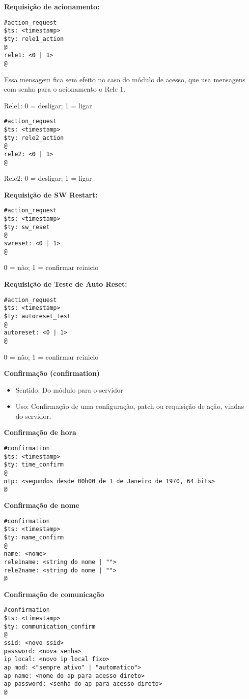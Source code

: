 \textbf{Requisição de acionamento:}
\begin{lstlisting}
#action_request
$ts: <timestamp>
$ty: rele1_action 
@
rele1: <0 | 1>
@
\end{lstlisting}
Essa mensagem fica sem efeito no caso do módulo de acesso, que usa mensagens com senha para o acionamento o Rele 1.

Rele1: 0 = desligar; 1 = ligar

\begin{lstlisting}
#action_request
$ts: <timestamp>
$ty: rele2_action
@
rele2: <0 | 1>
@
\end{lstlisting}
Rele2: 0 = desligar; 1 = ligar

\textbf{Requisição de SW Restart:}
\begin{lstlisting}
#action_request
$ts: <timestamp>
$ty: sw_reset
@
swreset: <0 | 1>
@
\end{lstlisting}
0 = não; 1 = confirmar reinicio

\textbf{Requisição de Teste de Auto Reset:}
\begin{lstlisting}
#action_request
$ts: <timestamp>
$ty: autoreset_test
@
autoreset: <0 | 1>
@
\end{lstlisting}
0 = não; 1 = confirmar reinicio

\textbf{Confirmação (confirmation)}
\begin{itemize}
\item Sentido: Do módulo para o servidor
\item Uso: Confirmação de uma configuração, patch ou requisição de ação, vindas do servidor.
\end{itemize}

\textbf{Confirmação de hora}
\begin{lstlisting}
#confirmation
$ts: <timestamp>
$ty: time_confirm
@
ntp: <segundos desde 00h00 de 1 de Janeiro de 1970, 64 bits>
@
\end{lstlisting}

\textbf{Confirmação de nome}
\begin{lstlisting}
#confirmation
$ts: <timestamp>
$ty: name_confirm
@
name: <nome>
rele1name: <string do nome | "">
rele2name: <string do nome | "">
@
\end{lstlisting}

\textbf{Confirmação de comunicação}
\begin{lstlisting}
#confirmation
$ts: <timestamp>
$ty: communication_confirm
@
ssid: <novo ssid>
password: <nova senha>
ip local: <novo ip local fixo>
ap mod: <"sempre ativo" | "automatico">
ap name: <nome do ap para acesso direto>
ap password: <senha do ap para acesso direto>
@
\end{lstlisting}

